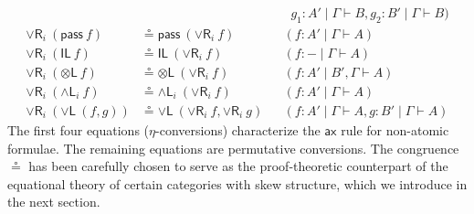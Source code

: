 \documentclass[submission,copyright,creativecommons]{eptcs}
\theoremstyle{definition}
\newcommand{\tl}{\otimes \mathsf{L}}
\newcommand{\pass}{\mathsf{pass}}
\newcommand{\unitl}{\mathsf{IL}}
\newcommand{\andli}{\land \mathsf{L}_{i}}
\newcommand{\orl}{\lor \mathsf{L}}
\newcommand{\orri}{\lor \mathsf{R}_{i}}
\newcommand{\ax}{\mathsf{ax}}
\begin{document}
\begin{equation}
\begin{array}{rlll}
    \\
    & &&\;\;g_1 : A' \mid \Gamma \vdash B , g_2 : B' \mid \Gamma \vdash B)
    \\
    \orri \ (\pass \ f) &\circeq \pass \ (\orri \ f) &&(f : A' \mid \Gamma \vdash A)
    \\
    \orri \ (\unitl \ f) &\circeq \unitl \ (\orri \ f) &&(f : - \mid \Gamma \vdash A)
    \\
    \orri \ (\tl \ f) &\circeq \tl \ (\orri \ f) &&(f : A' \mid B' , \Gamma \vdash A)
    \\
    \orri \ (\andli \ f) &\circeq \andli \ (\orri \ f) &&(f : A' \mid \Gamma \vdash A)
    \\
    \orri \ (\orl \ (f , g)) &\circeq \orl \ (\orri \ f , \orri \ g) &&(f : A' \mid \Gamma \vdash A , g : B' \mid \Gamma \vdash A)
  \end{array}
  \end{equation}
The first four equations ($\eta$-conversions) characterize the $\ax$ rule for non-atomic formulae. The remaining equations are permutative conversions. The congruence $\circeq$ has been carefully chosen to serve as the proof-theoretic counterpart of the equational theory of certain categories with skew structure, which we introduce in the next section.
\end{document}
